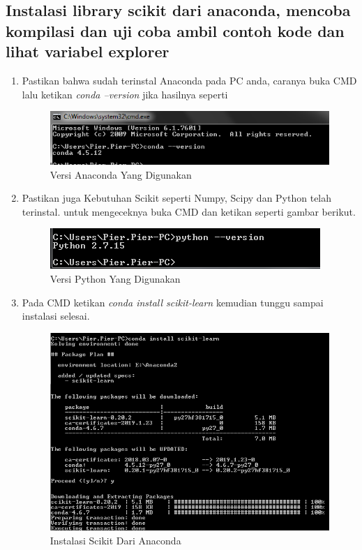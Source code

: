 \subsection{Instalasi library scikit dari anaconda, mencoba kompilasi dan uji coba ambil contoh kode dan lihat variabel explorer}
\begin{enumerate}
\item Pastikan bahwa sudah terinstal Anaconda pada PC anda, caranya buka CMD lalu ketikan \textit{conda --version} jika hasilnya seperti
\begin{figure}
	\begin{center}
   	 \includegraphics[scale=0.5]{figures/versiconda.png}
   	 \caption{Versi Anaconda Yang Digunakan}	
	\end{center}
\end{figure}

\item Pastikan juga Kebutuhan Scikit seperti Numpy, Scipy dan Python telah terinstal. untuk mengeceknya buka CMD dan ketikan seperti gambar berikut.
\begin{figure}
	\begin{center}
   	 \includegraphics[scale=0.5]{figures/gambar.png}
   	 \caption{Versi Python Yang Digunakan}	
	\end{center}
\end{figure}

\item Pada CMD ketikan \textit{conda install scikit-learn} kemudian tunggu sampai instalasi selesai.
\begin{figure}[!htbp]
	\begin{center}
   	 \includegraphics[scale=0.5]{figures/instalscikit.png}
   	 \caption{Instalasi Scikit Dari Anaconda}	
	\end{center}
\end{figure}


\end{enumerate}
